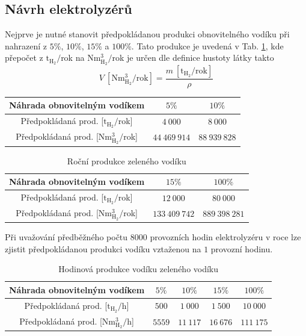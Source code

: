 \subsection{Návrh elektrolyzérů}

Nejprve je nutné stanovit předpokládanou produkci obnovitelného vodíku při nahrazení z $5\%$, $10\%$, $15\%$ a $100\%$. Tato produkce je uvedená v Tab. \ref{tab:h2_rocni_produkce}, kde přepočet z $\mathrm{t_{H_2}}/$rok na $\mathrm{Nm^3_{H_2}}/$rok je určen dle definice hustoty látky takto
\begin{equation}
    V\ [\mathrm{Nm^3_{H_2}/rok}] = \frac{m\ [\mathrm{t_{H_2}/rok}]}{\rho}
\end{equation}

\newpage
\begin{table}[h!]
    \centering
    \begin{tabular}{|c|c|c|}
        \hline
        Náhrada obnovitelným vodíkem & $5\%$ & $10\%$\\ \hline\hline
        Předpokládaná prod. [$\mathrm{t_{H_2}}/$rok] & $4\ 000$ & $8\ 000$\\ \hline
        Předpokládaná prod. [$\mathrm{Nm^3_{H_2}}/$rok] & $44\ 469\ 914$ & $88\ 939\ 828$\\ \hline
    \end{tabular}
\end{table}
\begin{table}[h!]
    \centering
    \begin{tabular}{|c|c|c|}
        \hline
        Náhrada obnovitelným vodíkem & $15\%$ & $100\%$\\ \hline\hline
        Předpokládaná prod. [$\mathrm{t_{H_2}}/$rok] & $12\ 000$ & $80\ 000$\\ \hline
        Předpokládaná prod. [$\mathrm{Nm^3_{H_2}}/$rok] & $133\ 409\ 742$ & $889\ 398\ 281$\\ \hline
    \end{tabular}
    \caption[Roční produkce zeleného vodíku]{Roční produkce zeleného vodíku}
    \label{tab:h2_rocni_produkce}
\end{table}
\noindent
Při uvažování předběžného počtu $8000$ provozních hodin elektrolyzéru v roce lze zjistit předpokládanou produkci vodíku vztaženou na $1$ provozní hodinu.
\begin{table}[h]
    \centering
    \begin{tabular}{|c|c|c|c|c|}
        \hline
        Náhrada obnovitelným vodíkem & $5\%$ & $10\%$ & $15\%$ & $100\%$\\ \hline\hline
        Předpokládaná prod. [$\mathrm{t_{H_2}}/$h] & $500$ & $1\ 000$ & $1\ 500$ & $10\ 000$\\ \hline
        Předpokládaná prod. [$\mathrm{Nm^3_{H_2}}/$h] & $5559$ & $11\ 117$ & $16\ 676$ & $111\ 175$\\ \hline
    \end{tabular}
    \caption[Hodinová produkce vodíku zeleného vodíku]{Hodinová produkce vodíku zeleného vodíku}
    \label{tab:h2_hodinova_produkce}
\end{table}


